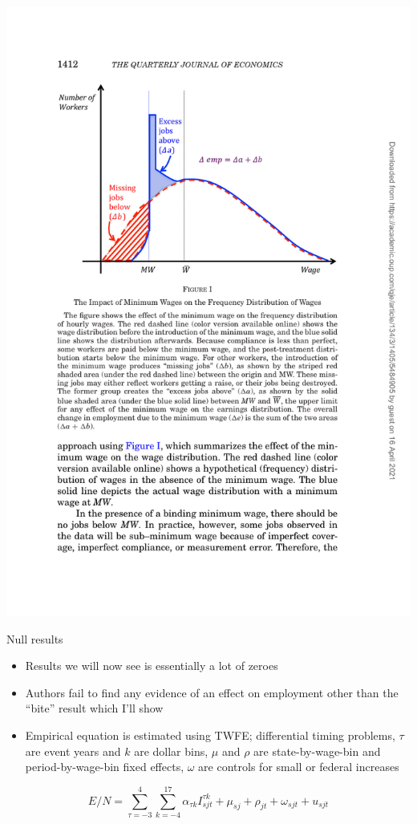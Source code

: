 \documentclass{beamer}
\begin{document}
\includegraphics{./lecture_includes/dube_a.pdf}

\begin{frame}{Null results}

\begin{itemize}
\item Results we will now see is essentially a lot of zeroes
\item Authors fail to find any evidence of an effect on employment other than the ``bite'' result which I'll show
\item Empirical equation is estimated using TWFE; differential timing problems, $\tau$ are event years and $k$ are dollar bins, $\mu$ and $\rho$ are state-by-wage-bin and period-by-wage-bin fixed effects, $\omega$ are controls for small or federal increases
\end{itemize}

\begin{equation}
E/N = \sum_{\tau=-3}^4 \sum_{k=-4}^{17} \alpha_{\tau k}I^{\tau k}_{sjt} + \mu_{sj} + \rho_{jt} + \omega_{sjt} + u_{sjt}
\end{equation}

\end{frame}
\end{document}
